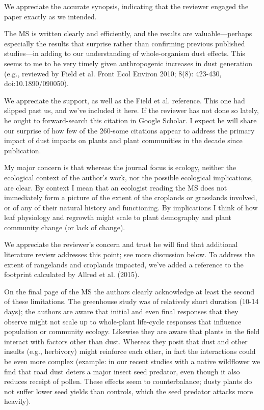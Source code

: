 \documentclass[parskip=half]{scrartcl}
\newcommand{\AR}[1]
	{\color{PineGreen}#1\color{black} \par }
\begin{document}
\AR{We appreciate the accurate synopsis, indicating that the reviewer engaged the paper exactly as we intended.}

The MS is written clearly and efficiently, and the results are valuable—perhaps especially the results that surprise rather than confirming previous published studies—in adding to our understanding of whole-organism dust effects. This seems to me to be very timely given anthropogenic increases in dust generation (e.g., reviewed by Field et al. Front Ecol Environ 2010; 8(8): 423-430, doi:10.1890/090050).

\AR{We appreciate the support, as well as the Field et al. reference. This one had slipped past us, and we've included it here. If the reviewer has not done so lately, he ought to forward-search this citation in Google Scholar. I expect he will share our surprise of how few of the 260-some citations appear to address the primary impact of dust impacts on plants and plant communities in the decade since publication.}

My major concern is that whereas the journal focus is ecology, neither the ecological context of the author's work, nor the possible ecological implications, are clear. By context I mean that an ecologist reading the MS does not immediately form a picture of the extent of the croplands or grasslands involved, or of any of their natural history and functioning. By implications I think of how leaf physiology and regrowth might scale to plant demography and plant community change (or lack of change).

\AR{We appreciate the reviewer's concern and trust he will find that additional literature review addresses this point; see more discussion below. To address the extent of rangelands and croplands impacted, we've added a reference to the footprint calculated by Allred et al. (2015). }

On the final page of the MS the authors clearly acknowledge at least the second of these limitations. The greenhouse study was of relatively short duration (10-14 days); the authors are aware that initial and even final responses that they observe might not scale up to whole-plant life-cycle responses that influence population or community ecology. Likewise they are aware that plants in the field interact with factors other than dust. Whereas they posit that dust and other insults (e.g., herbivory) might reinforce each other, in fact the interactions could be even more complex (example: in our recent studies with a native wildflower we find that road dust deters a major insect seed predator, even though it also reduces receipt of pollen. These effects seem to counterbalance; dusty plants do not suffer lower seed yields than controls, which the seed predator attacks more heavily).
\end{document}
